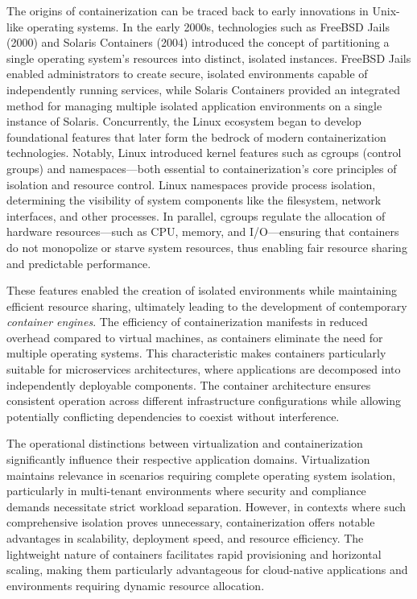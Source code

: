 The origins of containerization can be traced back to early innovations in Unix-like operating systems. In the early 2000s, technologies such as FreeBSD Jails (2000) and Solaris Containers (2004) introduced the concept of partitioning a single operating system's resources into distinct, isolated instances. FreeBSD Jails enabled administrators to create secure, isolated environments capable of independently running services, while Solaris Containers provided an integrated method for managing multiple isolated application environments on a single instance of Solaris. Concurrently, the Linux ecosystem began to develop foundational features that later form the bedrock of modern containerization technologies. Notably, Linux introduced kernel features such as cgroups (control groups) and namespaces—both essential to containerization's core principles of isolation and resource control. Linux namespaces provide process isolation, determining the visibility of system components like the filesystem, network interfaces, and other processes. In parallel, cgroups regulate the allocation of hardware resources—such as CPU, memory, and I/O—ensuring that containers do not monopolize or starve system resources, thus enabling fair resource sharing and predictable performance.

These features enabled the creation of isolated environments while maintaining efficient resource sharing, ultimately leading to the development of contemporary \emph{container engines}. The efficiency of containerization manifests in reduced overhead compared to virtual machines, as containers eliminate the need for multiple operating systems. This characteristic makes containers particularly suitable for microservices architectures, where applications are decomposed into independently deployable components. The container architecture ensures consistent operation across different infrastructure configurations while allowing potentially conflicting dependencies to coexist without interference.

The operational distinctions between virtualization and containerization significantly influence their respective application domains. Virtualization maintains relevance in scenarios requiring complete operating system isolation, particularly in multi-tenant environments where security and compliance demands necessitate strict workload separation. However, in contexts where such comprehensive isolation proves unnecessary, containerization offers notable advantages in scalability, deployment speed, and resource efficiency. The lightweight nature of containers facilitates rapid provisioning and horizontal scaling, making them particularly advantageous for cloud-native applications and environments requiring dynamic resource allocation.

